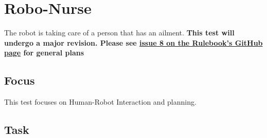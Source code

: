 \section{Robo-Nurse}

The robot is taking care of a person that has an ailment. 
\textbf{This test will undergo a major revision. 
Please see \href{https://github.com/RCAtHome2015/RuleBook/issues/8}{issue 8 on the Rulebook's GitHub page} for general plans}

\subsection{Focus}

This test focuses on Human-Robot Interaction and planning.

\subsection{Task}
